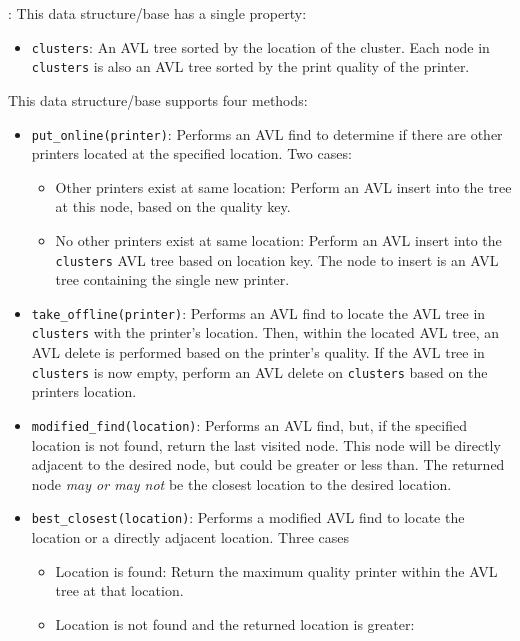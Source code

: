 \documentclass[12pt,twoside]{article}
\begin{document}
\begin{problems}
\begin{problemparts}
: This data structure/base has a single
    property:
    \begin{itemize}
        \item {\tt clusters}: An AVL tree sorted by the location of the
        cluster. Each node in {\tt clusters} is also an AVL tree sorted by
        the print quality of the printer.
    \end{itemize}
    This data structure/base supports four methods:
    \begin{itemize}
        \item {\tt put\_online(printer)}: Performs an AVL find to determine
        if there are other printers located at the specified location. Two
        cases:
        \begin{itemize}
            \item Other printers exist at same location: Perform an AVL
            insert into the tree at this node, based on the quality key.
            \item No other printers exist at same location: Perform an AVL
            insert into the {\tt clusters} AVL tree based on location key.
            The node to insert is an AVL tree containing the single new
            printer.
        \end{itemize}
        \item {\tt take\_offline(printer)}: Performs an AVL find to locate
        the AVL tree in {\tt clusters} with the printer's location. Then,
        within the located AVL tree, an AVL delete is performed based on the
        printer's quality. If the AVL tree in {\tt clusters} is now empty,
        perform an AVL delete on {\tt clusters} based on the printers
        location.
        \item {\tt modified\_find(location)}: Performs an AVL find, but, if
        the specified location is not found, return the last visited node.
        This node will be directly adjacent to the desired node, but could be
        greater or less than. The returned node {\it may or may not} be the
        closest location to the desired location.
        \item {\tt best\_closest(location)}: Performs a modified AVL find to
        locate the location or a directly adjacent location. Three cases
        \begin{itemize}
            \item Location is found: Return the maximum quality printer
            within the AVL tree at that location.
            \item Location is not found and the returned location is greater:

\end{itemize}
\end{itemize}
\end{problemparts}
\end{problems}
\end{document}
